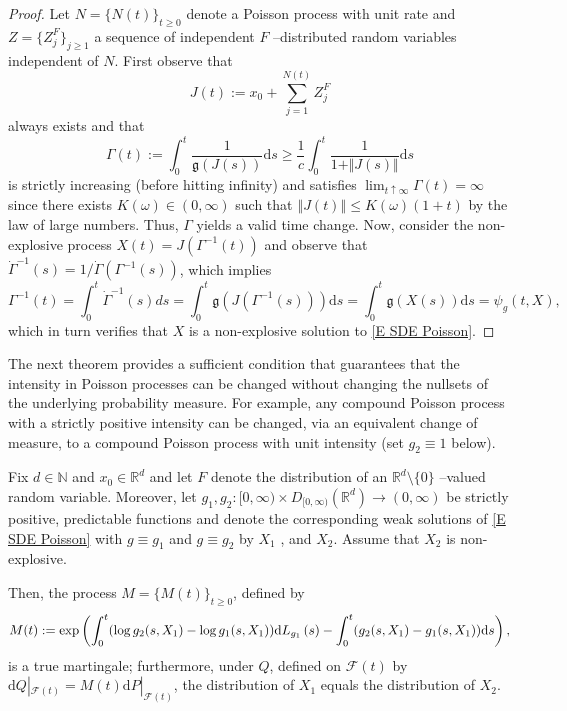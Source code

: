 \begin{proof}
Let $N=\{N\left( t\right) \}_{t\geq 0}$ denote a Poisson process with unit
rate and $Z=\{Z_{j}^{F}\}_{j\geq 1}$ a sequence of independent $F$%
--distributed random variables independent of $N$. First observe that
\begin{equation*}
J\left( t\right) :=x_{0}+\sum_{j=1}^{N\left( t\right) }Z_{j}^{F}
\end{equation*}%
always exists and that
\begin{equation*}
\Gamma (t):=\int_{0}^{t}\frac{1}{\mathfrak{g}(J(s))}\mathrm{d}s\geq \frac{1}{c}%
\int_{0}^{t}\frac{1}{1+\Vert J(s)\Vert }\mathrm{d}s
\end{equation*}%
is strictly increasing (before hitting infinity) and satisfies $\lim_{t \uparrow \infty} \Gamma(t) = \infty$ since there exists $K\left(
\omega \right) \in \left( 0,\infty \right) $ such that $\left\Vert
J(t)\right\Vert \leq K\left( \omega \right) \left( 1+t\right) $ by the law
of large numbers. Thus, $\Gamma $ yields a valid time change. Now, consider the non-explosive process $%
X(t)=J(\Gamma ^{-1}(t))$ and observe that $\dot{\Gamma}^{-1}\left( s\right)
=1/\dot{\Gamma}(\Gamma ^{-1}(s))$, which implies
\begin{equation*}
\Gamma ^{-1}(t)=\int_{0}^{t}\dot{\Gamma}^{-1}\left( s\right) ds=\int_{0}^{t}%
\mathfrak{g}(J(\Gamma ^{-1}(s)))\mathrm{d}s=\int_{0}^{t}\mathfrak{g}(X(s))%
\mathrm{d}s=\psi_g(t,X),
\end{equation*}%
which in turn verifies that $X$ is a non-explosive solution to \eqref{E SDE Poisson}.
\end{proof}

The next theorem provides a sufficient condition that guarantees that the
intensity in Poisson processes can be changed without changing the nullsets
of the underlying probability measure. For example, any compound Poisson
process with a strictly positive intensity can be changed, via an equivalent
change of measure, to a compound Poisson process with unit intensity (set $%
g_{2} \equiv1$ below).

\begin{theorem}
\label{T compound} Fix $d\in \mathbb{N}$ and $x_{0}\in {\mathbb{R}}^{d}$ and
let $F$ denote the distribution of an ${\mathbb{R}}^{d}\setminus \{0\}$%
--valued random variable. Moreover, let $g_{1},g_{2}:[0,\infty )\times
D_{[0,\infty )}({\mathbb{R}}^{d})\rightarrow (0,\infty )$ be strictly
positive, predictable functions and denote the corresponding weak solutions
of \eqref{E SDE Poisson} with $g\equiv g_{1}$ and $g\equiv g_{2}$ by $X_{1}$%
, and $X_{2}$. Assume that $X_{2}$ is non-explosive.

Then, the process $M=\{M\left( t\right) \}_{t\geq 0}$, defined by
\begin{equation*}
M(t):=\exp \left( \int_{0}^{t}(\log g_{2}(s,X_1 )-\log g_{1}(s,X_1 ))\mathrm{%
d}L_{g_{1}}\left( s\right) -\int_{0}^{t}(g_{2}(s,X_1 )-g_{1}(s,X_1 ))\mathrm{%
d}s\right) ,
\end{equation*}%
is a true martingale; furthermore, under $Q$, defined on $\mathcal{F}(t)$ by
$\mathrm{d}Q|_{\mathcal{F}(t)}=M(t)\mathrm{d}P|_{\mathcal{F}(t)}$, the
distribution of $X_{1}$ equals the distribution of $X_{2}$.
\end{theorem}

